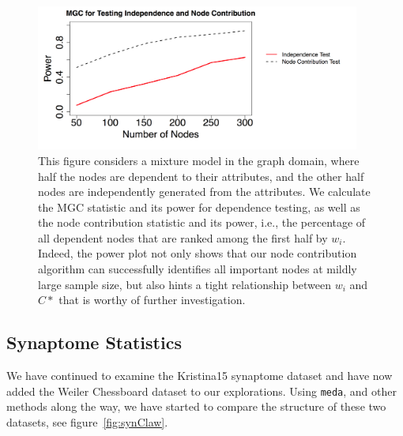 \documentclass[simplex.tex]{subfiles}
\begin{document}
\begin{figure}[h!]
\begin{cframed}
\centering
\includegraphics[width=0.95\textwidth]{../../figs/mgcPow.png}
\caption{
This figure considers a mixture model in the graph domain,
where half the nodes are dependent to their attributes, and the other
half nodes are independently generated from the attributes. We calculate
the MGC statistic and its power for dependence testing, as well as the
node contribution statistic and its power, i.e., the percentage of all
dependent nodes that are ranked among the first half by $w_i$.  Indeed,
the power plot not only shows that our node contribution algorithm can
successfully identifies all important nodes at mildly large sample size,
but also hints a tight relationship between $w_i$ and $C*$ that is
worthy of further investigation. 
}
\label{fig:mgcP}
\end{cframed}
\end{figure}


\subsection{Synaptome Statistics}

We have continued to examine the Kristina15 synaptome dataset and have
now added the Weiler Chessboard dataset to our explorations.  Using 
\verb+meda+, and other methods along the way, we have started to compare
the structure of these two datasets, see figure~\ref{fig:synClaw}.  
\end{document}
